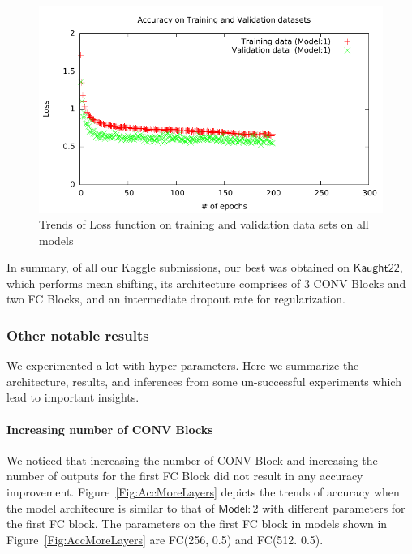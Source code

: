 \documentclass[]{article}
\newcommand*{\K}{\ensuremath{\mathsf{Kaught22}}}
\newcommand*{\Model}[1]{\ensuremath{\mathsf{Model}}:#1}
\begin{document}
\begin{figure}
\begin{minipage}{0.48\textwidth}
\end{minipage}
\hfill
\begin{minipage}{0.48\textwidth}
\includegraphics[scale=0.55, page=4]{Submissionlogs/LogLoss.pdf}
\end{minipage}
\caption{Trends of Loss function on training and validation data sets on all models}
\label{Fig:LossKaggle}
\end{figure}

In summary, of all our Kaggle submissions, our best was obtained on $\K$, which performs mean shifting, its architecture comprises of 3 CONV Blocks and two FC Blocks, and an intermediate dropout rate for regularization. 

\subsubsection{Other notable results}
We experimented a lot with hyper-parameters. Here we summarize the architecture, results, and inferences from some un-successful experiments which lead to important insights. 

\paragraph{Increasing number of CONV Blocks}
We noticed that increasing the number of CONV Block and increasing the number of outputs for the first FC Block did not result in any accuracy improvement. Figure~\ref{Fig:AccMoreLayers} depicts the trends of accuracy when the model architecure is similar to that of $\Model{2}$ with different parameters for the first FC block. The parameters on the first FC block in models shown in Figure~\ref{Fig:AccMoreLayers} are FC(256, 0.5) and FC(512. 0.5). 
\end{document}
